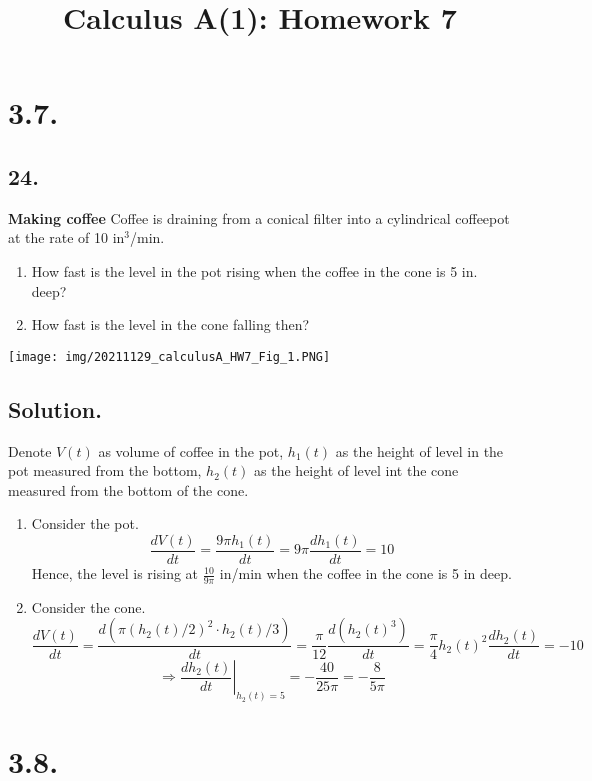\documentclass{article}
\title{Calculus A(1): Homework 7}
\begin{document}
\maketitle
\section*{3.7.}
\subsection*{24.}
\textbf{Making coffee} Coffee is draining from a conical filter into a cylindrical coffeepot at the rate of 10 in$^3$/min.
\begin{enumerate} [label=\textbf{\alph*.}]
    \item How fast is the level in the pot rising when the coffee in the cone is 5 in. deep?
    \item How fast is the level in the cone falling then?
\end{enumerate}
\texttt{[image: img/20211129\_calculusA\_HW7\_Fig\_1.PNG]}
\subsection*{Solution.}
Denote $V(t)$ as volume of coffee in the pot, $h_1(t)$ as the height of level in the pot measured from the bottom, $h_2(t)$ as the height of level int the cone measured from the bottom of the cone.
\begin{enumerate} [label=\textbf{\alph*.}]
    \item 
    Consider the pot.
    \[\frac{dV(t)}{dt}=\frac{9\pi h_1(t)}{dt}=9\pi \frac{dh_1(t)}{dt}=10\]
    Hence, the level is rising at $\frac{10}{9\pi}$ in/min when the coffee in the cone is 5 in deep.
    \item 
    Consider the cone.
    \[\frac{dV(t)}{dt}=\frac{d(\pi(h_2(t)/2)^2\cdot h_2(t)/3)}{dt}=\frac{\pi}{12}\frac{d(h_2(t)^3)}{dt}=\frac{\pi}{4}h_2(t)^2\frac{dh_2(t)}{dt}=-10\]
    \[\Rightarrow \left.\frac{dh_2(t)}{dt}\right\vert_{h_2(t)=5}=-\frac{40}{25\pi}=-\frac{8}{5\pi}\]
\end{enumerate}
\section*{3.8.}
\end{document}
